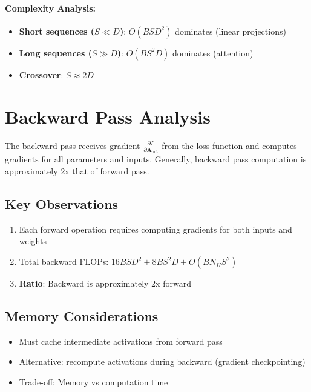 \documentclass[10pt]{article}
\begin{document}
\paragraph{Complexity Analysis:}
\begin{itemize}
  \item \textbf{Short sequences ($S \ll D$)}: $O(BSD^2)$ dominates (linear projections)
  \item \textbf{Long sequences ($S \gg D$)}: $O(BS^2D)$ dominates (attention)
  \item \textbf{Crossover}: $S \approx 2D$
\end{itemize}

\section{Backward Pass Analysis}
\label{sec:backward}

The backward pass receives gradient $\frac{\partial L}{\partial \mathbf{A}_{\text{out}}}$ from the loss function and computes gradients for all parameters and inputs. Generally, backward pass computation is approximately 2x that of forward pass.

\subsection{Key Observations}

\begin{enumerate}
  \item Each forward operation requires computing gradients for both inputs and weights
  \item Total backward FLOPs: $16BSD^2 + 8BS^2D + O(BN_H S^2)$
  \item \textbf{Ratio}: Backward is approximately 2x forward
\end{enumerate}

\subsection{Memory Considerations}

\begin{itemize}
  \item Must cache intermediate activations from forward pass
  \item Alternative: recompute activations during backward (gradient checkpointing)
  \item Trade-off: Memory vs computation time
\end{itemize}
\end{document}
